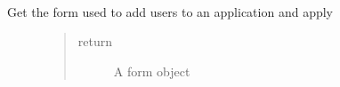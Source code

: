 \documentclass[letterpaper,10pt,english]{sphinxmanual}
\begin{document}
\begin{fulllineitems}
\label{\detokenize{index:views.forms.get_apply_form}}~\begin{description}
\item[{Get the form used to add users to an application and apply}] \leavevmode\begin{quote}\begin{description}
\item[{return}] \leavevmode
A form object

\end{description}\end{quote}

\end{description}

\end{fulllineitems}

\end{document}
